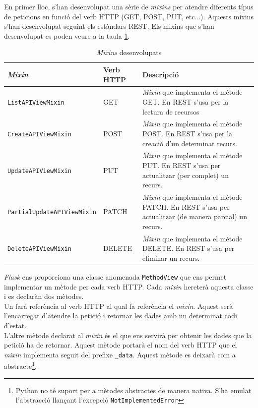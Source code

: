En primer lloc, s'han desenvolupat una sèrie de \emph{mixins} per atendre diferents típus de peticions en funció del verb \ac{HTTP} (GET, POST, PUT, etc...). Aquests mixins s'han desenvolupat seguint els estàndars \ac{REST}. Els mixins que s'han desenvolupat es poden veure a la taula \ref{table:mixins}. 

\begin{table}[h!]
 	\begin{center}
 		\begin{tabularx}{\textwidth}{|l|l|X|}
  			\hline
 			\bfseries \emph{Mixin} & \bfseries Verb \ac{HTTP} & \bfseries Descripció \\ \hline
			\texttt{ListAPIViewMixin} &  GET & \emph{Mixin} que implementa el mètode GET. En \ac{REST} s'usa per la lectura de recursos\\ \hline
			\texttt{CreateAPIViewMixin} & POST & \emph{Mixin} que implementa el mètode POST. En \ac{REST} s'usa per la creació d'un determinat recurs.\\ \hline
			\texttt{UpdateAPIViewMixin} & PUT & \emph{Mixin} que implementa el mètode PUT. En \ac{REST} s'usa per actualitzar (per complet) un recurs.\\ \hline
			\texttt{PartialUpdateAPIViewMixin} & PATCH & \emph{Mixin} que implementa el mètode PATCH. En \ac{REST} s'usa per actualitzar (de manera parcial) un recurs.\\ \hline
			\texttt{DeleteAPIViewMixin} & DELETE  & \emph{Mixin} que implementa el mètode DELETE. En \ac{REST} s'usa per eliminar un recurs.\\ \hline
		\end{tabularx}
	\end{center}
	\caption{\emph{Mixins} desenvolupats} 
	\label{table:mixins}
\end{table}

\emph{Flask} ens proporciona una classe anomenada \texttt{MethodView} que ens permet implementar un mètode per cada verb \ac{HTTP}. Cada \emph{mixin} hereterà aquesta classe i es declaràn dos mètodes. \\

Un farà referència al verb \ac{HTTP} al qual fa referència el \emph{mixin}. Aquest serà l'encarregat d'atendre la petició i retornar les dades amb un determinat codi d'estat.\\

L'altre mètode declarat al \emph{mixin} és el que ens servirà per obtenir les dades que la petició ha de retornar. Aquest mètode portarà el nom del verb \ac{HTTP} que el \emph{mixin} implementa seguit del prefixe \texttt{\_data}. Aquest mètode es deixarà com a abstracte\footnote{Python no té suport per a mètodes abstractes de manera nativa. S'ha emulat l'abstracció llançant l'excepció \texttt{NotImplementedError}}.\\

